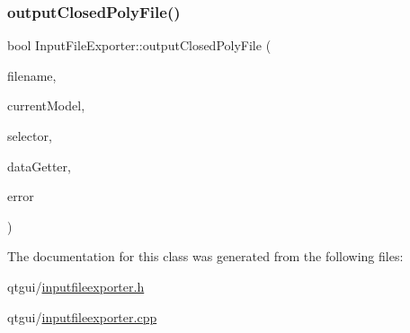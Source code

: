 \subsubsection{\texorpdfstring{outputClosedPolyFile()}{outputClosedPolyFile()}}
{\footnotesize\ttfamily bool Input\+File\+Exporter\+::output\+Closed\+Poly\+File (\begin{DoxyParamCaption}\item[{Q\+String}]{filename,  }\item[{\mbox{\hyperlink{class_displace_model}{Displace\+Model}} $\ast$}]{current\+Model,  }\item[{std\+::function$<$ bool(const \mbox{\hyperlink{classdisplace_1_1_node_penalty}{displace\+::\+Node\+Penalty}} \&)$>$}]{selector,  }\item[{std\+::function$<$ std\+::vector$<$ int $>$(const \mbox{\hyperlink{classdisplace_1_1_node_penalty}{displace\+::\+Node\+Penalty}} \&)$>$}]{data\+Getter,  }\item[{Q\+String $\ast$}]{error }\end{DoxyParamCaption})\hspace{0.3cm}{\ttfamily [protected]}}



The documentation for this class was generated from the following files\+:\begin{DoxyCompactItemize}
\item 
qtgui/\mbox{\hyperlink{inputfileexporter_8h}{inputfileexporter.\+h}}\item 
qtgui/\mbox{\hyperlink{inputfileexporter_8cpp}{inputfileexporter.\+cpp}}\end{DoxyCompactItemize}
